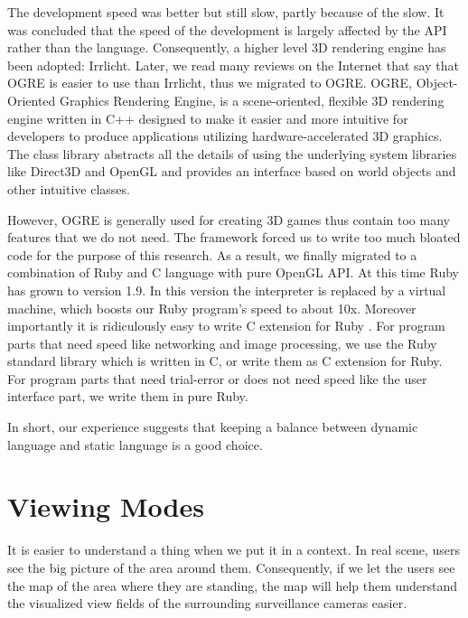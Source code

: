 The development speed was better but still slow, partly because of the slow. It was concluded that the speed of the development is largely affected by the API rather than the language. Consequently, a higher level 3D rendering engine has been adopted: Irrlicht. Later, we read many reviews on the Internet that say that OGRE \cite{Reference11} is easier to use than Irrlicht, thus we migrated to OGRE. OGRE, Object-Oriented Graphics Rendering Engine, is a scene-oriented, flexible 3D rendering engine written in C++ designed to make it easier and more intuitive for developers to produce applications utilizing hardware-accelerated 3D graphics. The class library abstracts all the details of using the underlying system libraries like Direct3D and OpenGL and provides an interface based on world objects and other intuitive classes.

However, OGRE is generally used for creating 3D games thus contain too many features that we do not need. The framework forced us to write too much bloated code for the purpose of this research. As a result, we finally migrated to a combination of Ruby and C language with pure OpenGL API. At this time Ruby has grown to version 1.9. In this version the interpreter is replaced by a virtual machine, which boosts our Ruby program's speed to about 10x. Moreover importantly it is ridiculously easy to write C extension for Ruby \cite{Reference15}. For program parts that need speed like networking and image processing, we use the Ruby standard library which is written in C, or write them as C extension for Ruby. For program parts that need trial-error or does not need speed like the user interface part, we write them in pure Ruby.

In short, our experience suggests that keeping a balance between dynamic language and static language is a good choice.


\section{Viewing Modes}

It is easier to understand a thing when we put it in a context. In real scene, users see the big picture of the area around them. Consequently, if we let the users see the map of the area where they are standing, the map will help them understand the visualized view fields of the surrounding surveillance cameras easier.

